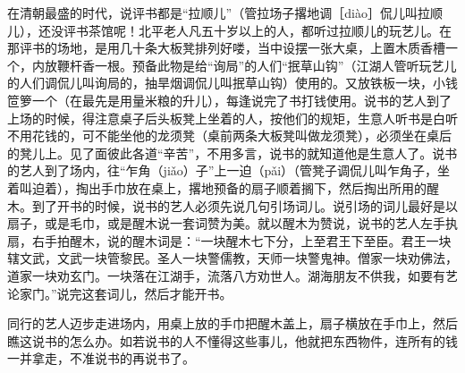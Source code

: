 \documentclass[12pt,UTF8]{ctexbook}
\begin{document}
在清朝最盛的时代，说评书都是“拉顺儿”（管拉场子撂地调［diào］侃儿叫拉顺儿），还没评书茶馆呢！北平老人凡五十岁以上的人，都听过拉顺儿的玩艺儿。在那评书的场地，是用几十条大板凳排列好喽，当中设摆一张大桌，上置木质香槽一个，内放鞭杆香一根。预备此物是给“询局”的人们“抿草山钩”（江湖人管听玩艺儿的人们调侃儿叫询局的，抽旱烟调侃儿叫抿草山钩）使用的。又放铁板一块，小钱笸箩一个（在最先是用量米粮的升儿），每逢说完了书打钱使用。说书的艺人到了上场的时候，得注意桌子后头板凳上坐着的人，按他们的规矩，生意人听书是白听不用花钱的，可不能坐他的龙须凳（桌前两条大板凳叫做龙须凳），必须坐在桌后的凳儿上。见了面彼此各道“辛苦”，不用多言，说书的就知道他是生意人了。说书的艺人到了场内，往“乍角（jiǎo）子”上一迫（pǎi）（管凳子调侃儿叫乍角子，坐着叫迫着），掏出手巾放在桌上，撂地预备的扇子顺着搁下，然后掏出所用的醒木。到了开书的时候，说书的艺人必须先说几句引场词儿。说引场的词儿最好是以扇子，或是毛巾，或是醒木说一套词赞为美。就以醒木为赞说，说书的艺人左手执扇，右手拍醒木，说的醒木词是：“一块醒木七下分，上至君王下至臣。君王一块辖文武，文武一块管黎民。圣人一块警儒教，天师一块警鬼神。僧家一块劝佛法，道家一块劝玄门。一块落在江湖手，流落八方劝世人。湖海朋友不供我，如要有艺论家门。”说完这套词儿，然后才能开书。

同行的艺人迈步走进场内，用桌上放的手巾把醒木盖上，扇子横放在手巾上，然后瞧这说书的怎么办。如若说书的人不懂得这些事儿，他就把东西物件，连所有的钱一并拿走，不准说书的再说书了。
\end{document}
